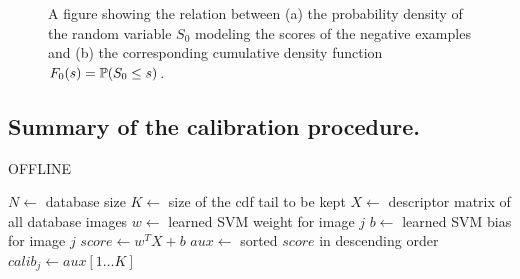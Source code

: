       \begin{figure}[t]
         \vspace*{-3mm}
         \caption{A figure showing the relation between (a) the probability density of the random variable $S_0$ modeling the scores of the negative examples and (b) the corresponding cumulative density function $F_0(s)=\mathbb{P}(S_0 \leq s)$.
         }
               \vspace*{-3mm}
         \label{fig:qntExample}
      \end{figure}
   \subsection{Summary of the calibration procedure.}

      \begin{algorithm}
         \caption{OFFLINE}\label{alg:offline}
         \begin{algorithmic}[1]
         \State $N \gets$ database size
         \State $K \gets$ size of the cdf tail to be kept
         \State $X \gets$ descriptor matrix of all database images
            \State $w \gets$ learned SVM weight for image $j$
            \State $b \gets$ learned SVM bias for image $j$
            \State $score \gets w^TX+b$
            \State $aux \gets$ sorted $score$ in descending order
            \State $calib_j \gets aux[1\dots K]$
         \EndFor
         \EndProcedure
         \end{algorithmic}
      \end{algorithm}

